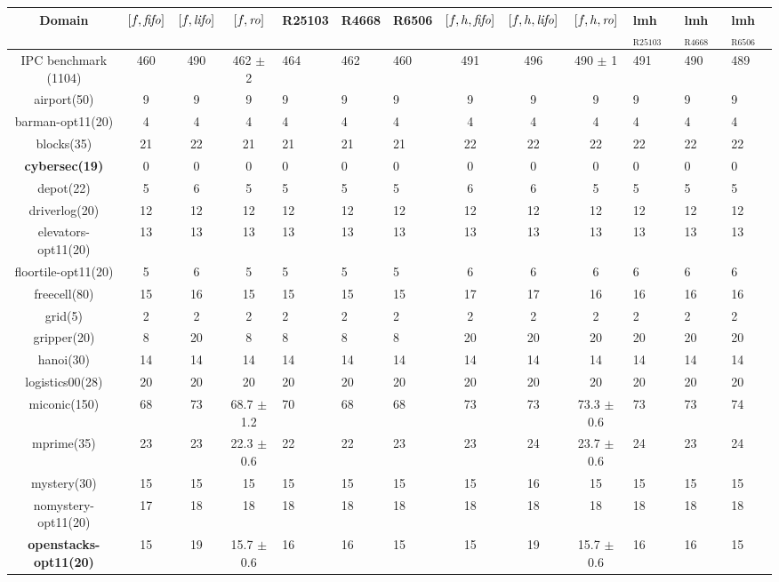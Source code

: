 \begin{center}
\begin{tabular}{|c|cccHHH|cccHHH|}
\hline
Domain & $[f,{\text{\textit{fifo}}}]$ & $[f,{\text{\textit{lifo}}}]$ & $[f,{\text{\textit{ro}}}]$ & R25103 & R4668 & R6506 & $[f,h,{\text{\textit{fifo}}}]$ & $[f,h,{\text{\textit{lifo}}}]$ & $[f,h,{\text{\textit{ro}}}]$ & lmh$_{\text{R25103}}$ & lmh$_{\text{R4668}}$ & lmh$_{\text{R6506}}$\\
\hline
IPC benchmark (1104) & 460 & 490 & 462 $\pm$ 2 & 464 & 462 & 460 & 491 & 496 & 490 $\pm$ 1 & 491 & 490 & 489\\
\hline
airport(50) & 9 & 9 & 9 & 9 & 9 & 9 & 9 & 9 & 9 & 9 & 9 & 9\\
barman-opt11(20) & 4 & 4 & 4 & 4 & 4 & 4 & 4 & 4 & 4 & 4 & 4 & 4\\
blocks(35) & 21 & 22 & 21 & 21 & 21 & 21 & 22 & 22 & 22 & 22 & 22 & 22\\
\textbf{cybersec(19)} & 0 & 0 & 0 & 0 & 0 & 0 & 0 & 0 & 0 & 0 & 0 & 0\\
depot(22) & 5 & 6 & 5 & 5 & 5 & 5 & 6 & 6 & 5 & 5 & 5 & 5\\
driverlog(20) & 12 & 12 & 12 & 12 & 12 & 12 & 12 & 12 & 12 & 12 & 12 & 12\\
elevators-opt11(20) & 13 & 13 & 13 & 13 & 13 & 13 & 13 & 13 & 13 & 13 & 13 & 13\\
floortile-opt11(20) & 5 & 6 & 5 & 5 & 5 & 5 & 6 & 6 & 6 & 6 & 6 & 6\\
freecell(80) & 15 & 16 & 15 & 15 & 15 & 15 & 17 & 17 & 16 & 16 & 16 & 16\\
grid(5) & 2 & 2 & 2 & 2 & 2 & 2 & 2 & 2 & 2 & 2 & 2 & 2\\
gripper(20) & 8 & 20 & 8 & 8 & 8 & 8 & 20 & 20 & 20 & 20 & 20 & 20\\
hanoi(30) & 14 & 14 & 14 & 14 & 14 & 14 & 14 & 14 & 14 & 14 & 14 & 14\\
logistics00(28) & 20 & 20 & 20 & 20 & 20 & 20 & 20 & 20 & 20 & 20 & 20 & 20\\
miconic(150) & 68 & 73 & 68.7 $\pm$ 1.2 & 70 & 68 & 68 & 73 & 73 & 73.3 $\pm$ 0.6 & 73 & 73 & 74\\
mprime(35) & 23 & 23 & 22.3 $\pm$ 0.6 & 22 & 22 & 23 & 23 & 24 & 23.7 $\pm$ 0.6 & 24 & 23 & 24\\
mystery(30) & 15 & 15 & 15 & 15 & 15 & 15 & 15 & 16 & 15 & 15 & 15 & 15\\
nomystery-opt11(20) & 17 & 18 & 18 & 18 & 18 & 18 & 18 & 18 & 18 & 18 & 18 & 18\\
\textbf{openstacks-opt11(20)} & 15 & 19 & 15.7 $\pm$ 0.6 & 16 & 16 & 15 & 15 & 19 & 15.7 $\pm$ 0.6 & 16 & 16 & 15\\

\end{tabular}
\end{center}
